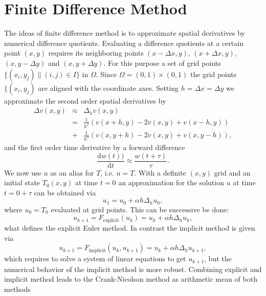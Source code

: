 \documentclass[a4paper,11pt]{article}
\theoremstyle{plain} %
\theoremstyle{definition} %
\theoremstyle{remark} %
\theoremstyle{remark}
\def\Temp{T}
\def\uTemp{u}
\begin{document}
\section{Finite Difference Method}
The ideas of finite difference method is to approximate spatial derivatives by numerical difference quotients. Evaluating a difference quotients at a certain point $(x,y)$ requires its neighboring points $(x-\Delta x,y)$, $(x+\Delta x,y)$, $(x,y-\Delta y)$ and $(x,y+\Delta y)$. For this purpose a set of grid points $\{ (x_i, y_j) \| (i,j) \in I\} $ in $\Omega $. Since $\Omega = ( 0,1 ) \times ( 0,1 ) $ the grid points $\{ (x_i, y_j) $ are aligned with the coordinate axes.
Setting $ h= \Delta x = \Delta y $ we approximate the second order spatial derivatives by
\begin{eqnarray*}
\Delta v(x,y) & \approx & \Delta_h v(x,y) \\
 & = & \frac{1}{h^2}\left(v(x+h, y) -2 v(x,y) + v(x-h,y) \right) \\
& + & \frac{1}{h^2}\left( v(x, y+h) -2 v(x,y) + v(x,y-h) \right),
\end{eqnarray*}
and the first order time derivative by a forward difference
\begin{equation*}
\frac{\mathrm{d} w(t) )}{\mathrm{d} t } \approx \frac{w(t+\tau )}{\tau } .
\end{equation*}
We now use $ \uTemp $ as an alias for $ \Temp $, i.e. $\uTemp = \Temp $.
With a definite $(x,y)$ grid and an initial state $T_0 (x,y) $ at time $t=0$ an approximation for the solution $\uTemp$ at time $t= 0 +\tau $ can be obtained via
\begin{equation*}
\uTemp_1 = \uTemp_0 + \alpha h\Delta_h \uTemp_0,
\end{equation*}
where $ \uTemp_0 = T_0 $ evaluated at grid points. This can be successive be done:
\begin{equation*}
\uTemp_{k+1} = F_{\mathrm{explicit}} (\uTemp_k) = \uTemp_k + \alpha h \Delta_h \uTemp_k,
\end{equation*}
what defines the explicit Euler method. In contrast the implicit method is given via
\begin{equation*}
\uTemp_{k+1} = F_{\mathrm{implicit}} (\uTemp_k, \uTemp_{k+1}) =\uTemp_k + \alpha h \Delta_h \uTemp_{k+1},
\end{equation*}
which requires to solve a system of linear equations to get $\uTemp_{k+1} $, but the numerical behavior of the implicit method is more robust.
Combining explicit and implicit method leads to the Crank-Nicolson method as arithmetic mean of both methods
\end{document}
